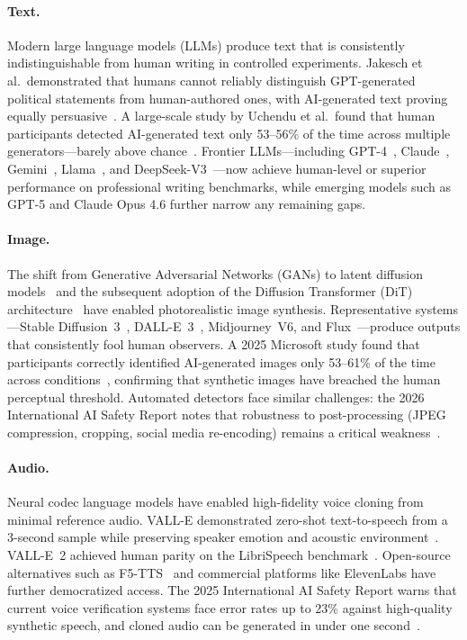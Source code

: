 \paragraph{Text.}
Modern large language models (LLMs) produce text that is consistently indistinguishable from human writing in controlled experiments. Jakesch et al.\ demonstrated that humans cannot reliably distinguish GPT-generated political statements from human-authored ones, with AI-generated text proving equally persuasive~\cite{jakesch2023human}. A large-scale study by Uchendu et al.\ found that human participants detected AI-generated text only 53--56\% of the time across multiple generators---barely above chance~\cite{uchendu2023human}. Frontier LLMs---including GPT-4~\cite{gpt4}, Claude~\cite{anthropic2025claude}, Gemini~\cite{gemini2024}, Llama~\cite{llama3}, and DeepSeek-V3~\cite{deepseekv3}---now achieve human-level or superior performance on professional writing benchmarks, while emerging models such as GPT-5 and Claude Opus 4.6 further narrow any remaining gaps.

\paragraph{Image.}
The shift from Generative Adversarial Networks (GANs) to latent diffusion models~\cite{rombach2022ldm} and the subsequent adoption of the Diffusion Transformer (DiT) architecture~\cite{peebles2023dit} have enabled photorealistic image synthesis. Representative systems---Stable Diffusion~3~\cite{esser2024sd3}, DALL-E~3~\cite{dalle3}, Midjourney~V6, and Flux~\cite{flux2024}---produce outputs that consistently fool human observers. A 2025 Microsoft study found that participants correctly identified AI-generated images only 53--61\% of the time across conditions~\cite{microsoft2025human}, confirming that synthetic images have breached the human perceptual threshold. Automated detectors face similar challenges: the 2026 International AI Safety Report notes that robustness to post-processing (JPEG compression, cropping, social media re-encoding) remains a critical weakness~\cite{aisafetyreport2026}.

\paragraph{Audio.}
Neural codec language models have enabled high-fidelity voice cloning from minimal reference audio. VALL-E demonstrated zero-shot text-to-speech from a 3-second sample while preserving speaker emotion and acoustic environment~\cite{wang2023valle}. VALL-E~2 achieved human parity on the LibriSpeech benchmark~\cite{chen2024valle2}. Open-source alternatives such as F5-TTS~\cite{chen2024f5tts} and commercial platforms like ElevenLabs have further democratized access. The 2025 International AI Safety Report warns that current voice verification systems face error rates up to 23\% against high-quality synthetic speech, and cloned audio can be generated in under one second~\cite{aisafetyreport2025}.

